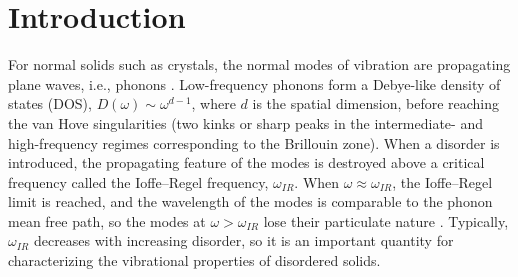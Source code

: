 \documentclass[twocolumn,printnumbers,amsmath,amssymb,prl,verbatim]{revtex4}
\begin{document}

\pacs{}

\maketitle

\section{Introduction}
\label{sec:intro}

For normal solids such as crystals, the normal modes of vibration are propagating plane waves, i.e., phonons \cite{kittel, ascroft}. Low-frequency phonons form a Debye-like density of states (DOS), $D(\omega)\sim \omega^{d-1}$, where $d$ is the spatial dimension, before reaching the van Hove singularities (two kinks or sharp peaks in the intermediate- and high-frequency regimes corresponding to the Brillouin zone). When a disorder is introduced, the propagating feature of the modes is destroyed above a critical frequency called the Ioffe--Regel frequency, $\omega_{IR}$. When $\omega\approx \omega_{IR}$, the Ioffe--Regel limit is reached, and the wavelength of the modes is comparable to the phonon mean free path, so the modes at $\omega>\omega_{IR}$ lose their particulate nature \cite{ioffe}. Typically, $\omega_{IR}$ decreases with increasing disorder, so it is an important quantity for characterizing the vibrational properties of disordered solids.
\end{document}
